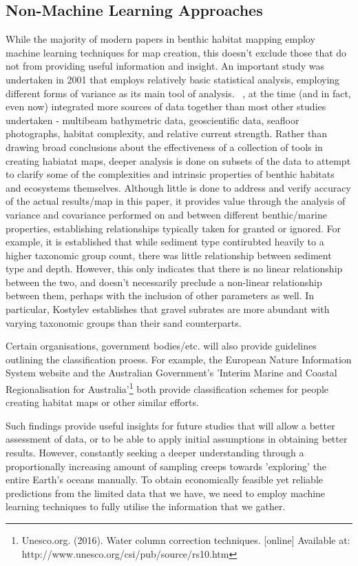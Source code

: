 \documentclass[12pt]{article}
\begin{document}
            \subsection{Non-Machine Learning Approaches} 
            While the majority of modern papers in benthic habitat mapping employ machine learning techniques for map creation, this doesn't exclude those that do not from providing useful information and insight. An important study was undertaken in 2001 that employs relatively basic statistical analysis, employing different forms of variance as its main tool of analysis. ~\citep{kostylev01}, at the time (and in fact, even now) integrated more sources of data together than most other studies undertaken - multibeam bathymetric data, geoscientific data, seafloor photographs, habitat complexity, and relative current strength. Rather than drawing broad conclusions about the effectiveness of a collection of tools in creating habiatat maps, deeper analysis is done on subsets of the data to attempt to clarify some of the complexities and intrinsic properties of benthic habitats and ecosystems themselves. Although little is done to address and verify accuracy of the actual results/map in this paper, it provides value through the analysis of variance and covariance performed on and between different benthic/marine properties, establishing relationships typically taken for granted or ignored. For example, it is established that while sediment type contirubted heavily to a higher taxonomic group count, there was little relationship between sediment type and depth. However, this only indicates that there is no linear relationship between the two, and doesn't necessarily preclude a non-linear relationship between them, perhaps with the inclusion of other parameters as well. In particular, Kostylev establishes that gravel subrates are more abundant with varying taxonomic groups than their sand counterparts.

            \pagebreak
            Certain organisations, government bodies/etc. will also provide guidelines outlining the classification proess. For example, the European Nature Information System website and the Australian Government's 'Interim Marine and Coastal Regionalisation for Australia'\footnote{Unesco.org. (2016). Water column correction techniques. [online] Available at: http://www.unesco.org/csi/pub/source/rs10.htm} both provide classification schemes for people creating habitat maps or other similar efforts.

            Such findings provide useful insights for future studies that will allow a better assessment of data, or to be able to apply initial assumptions in obtaining better results. However, constantly seeking a deeper understanding through a proportionally increasing amount of sampling creeps towards 'exploring' the entire Earth's oceans manually. To obtain economically feasible yet reliable predictions from the limited data that we have, we need to employ machine learning techniques to fully utilise the information that we gather.
\end{document}
